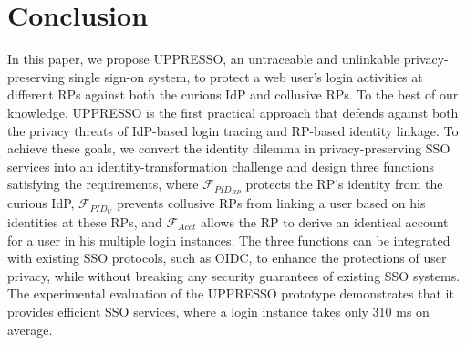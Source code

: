 \section{Conclusion}
\label{sec:conclusion}
In this paper, we propose UPPRESSO, an untraceable and unlinkable privacy-preserving single sign-on system,
 to protect a web user's login activities at different RPs against both the curious IdP and collusive RPs.
To the best of our knowledge,
 UPPRESSO is the first practical approach
    that defends against both the privacy threats of IdP-based login tracing and RP-based identity linkage.
To achieve these goals, we convert the identity dilemma in privacy-preserving SSO services into an identity-transformation challenge
 and design three functions satisfying the requirements,
 where $\mathcal{F}_{PID_{RP}}$ protects the RP's identity from the curious IdP,
 $\mathcal{F}_{PID_{U}}$ prevents collusive RPs from linking a user based on his identities at these RPs,
 and $\mathcal{F}_{Acct}$ allows the RP to derive an identical account for a user in his multiple login instances.
The three functions can be integrated with existing SSO protocols,
    such as OIDC,
    to enhance the protections of user privacy,
    while without breaking any security guarantees of existing SSO systems.
The experimental evaluation of the UPPRESSO prototype demonstrates
 that it provides efficient SSO services, where a login instance takes only 310 ms on average.

